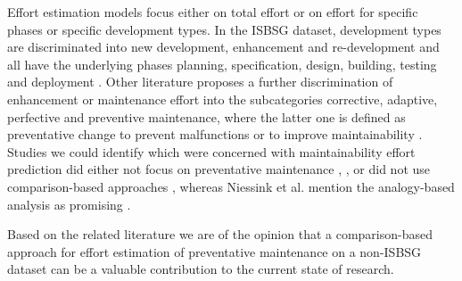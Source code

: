Effort estimation models focus either on total effort or on effort for specific phases or specific development types. In the ISBSG dataset, development types are discriminated into new development, enhancement and re-development and all have the underlying phases planning, specification, design, building, testing and deployment \cite{lenarduzzi2014estimating}. Other literature proposes a further discrimination of enhancement or maintenance effort into the subcategories corrective, adaptive, perfective and preventive maintenance, where the latter one is defined as preventative change to prevent malfunctions or to improve maintainability \cite{grubb2003software}.
Studies we could identify which were concerned with maintainability effort prediction did either not focus on preventative maintenance \cite{hayes2004metrics}, \cite{basgalupp2012predicting}, \cite{leung2002estimating} or did not use comparison-based approaches \cite{jorgensen1995experience}, whereas Niessink et al. mention the analogy-based analysis as promising \cite{niessink1997predicting}.

Based on the related literature we are of the opinion that a comparison-based approach for effort estimation of preventative maintenance on a non-ISBSG dataset can be a valuable contribution to the current state of research.
